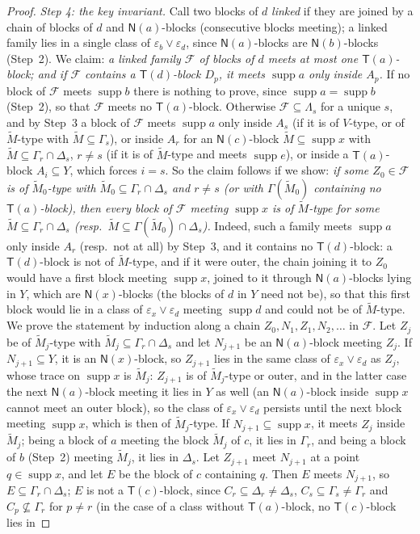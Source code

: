 \documentclass[11pt]{amsart}
\theoremstyle{definition}
\newcommand{\supp}{\operatorname{supp}}
\newcommand{\T}{\mathsf{T}}
\newcommand{\N}{\mathsf{N}}
\begin{document}
\begin{proof}
\smallskip
\emph{Step 4: the key invariant.} Call two blocks of $d$ \emph{linked} if they are joined by a chain of blocks of $d$ and $\N(a)$-blocks (consecutive blocks meeting); a linked family lies in a single class of $\varepsilon_b\vee\varepsilon_d$, since $\N(a)$-blocks are $\N(b)$-blocks (Step~2). We claim: \emph{a linked family $\mathcal F$ of blocks of $d$ meets at most one $\T(a)$-block; and if $\mathcal F$ contains a $\T(d)$-block $D_p$, it meets $\supp a$ only inside $A_p$.} If no block of $\mathcal F$ meets $\supp b$ there is nothing to prove, since $\supp a=\supp b$ (Step~2), so that $\mathcal F$ meets no $\T(a)$-block. Otherwise $\mathcal F\subseteq\Lambda_s$ for a unique $s$, and by Step~3 a block of $\mathcal F$ meets $\supp a$ only inside $A_s$ (if it is of $V$-type, or of $\tilde M$-type with $\tilde M\subseteq\Gamma_s$), or inside $A_r$ for an $\N(c)$-block $\tilde M\subseteq\supp x$ with $\tilde M\subseteq\Gamma_r\cap\Delta_s$, $r\ne s$ (if it is of $\tilde M$-type and meets $\supp e$), or inside a $\T(a)$-block $A_i\subseteq Y$, which forces $i=s$. So the claim follows if we show: \emph{if some $Z_0\in\mathcal F$ is of $\tilde M_0$-type with $\tilde M_0\subseteq\Gamma_r\cap\Delta_s$ and $r\ne s$ (or with $\Gamma(\tilde M_0)$ containing no $\T(a)$-block), then every block of $\mathcal F$ meeting $\supp x$ is of $\tilde M$-type for some $\tilde M\subseteq\Gamma_r\cap\Delta_s$ (resp.\ $\tilde M\subseteq\Gamma(\tilde M_0)\cap\Delta_s$).} Indeed, such a family meets $\supp a$ only inside $A_r$ (resp.\ not at all) by Step~3, and it contains no $\T(d)$-block: a $\T(d)$-block is not of $\tilde M$-type, and if it were outer, the chain joining it to $Z_0$ would have a first block meeting $\supp x$, joined to it through $\N(a)$-blocks lying in $Y$, which are $\N(x)$-blocks (the blocks of $d$ in $Y$ need not be), so that this first block would lie in a class of $\varepsilon_x\vee\varepsilon_d$ meeting $\supp d$ and could not be of $\tilde M$-type. We prove the statement by induction along a chain $Z_0,N_1,Z_1,N_2,\dots$ in $\mathcal F$. Let $Z_j$ be of $\tilde M_j$-type with $\tilde M_j\subseteq\Gamma_r\cap\Delta_s$ and let $N_{j+1}$ be an $\N(a)$-block meeting $Z_j$. If $N_{j+1}\subseteq Y$, it is an $\N(x)$-block, so $Z_{j+1}$ lies in the same class of $\varepsilon_x\vee\varepsilon_d$ as $Z_j$, whose trace on $\supp x$ is $\tilde M_j$: $Z_{j+1}$ is of $\tilde M_j$-type or outer, and in the latter case the next $\N(a)$-block meeting it lies in $Y$ as well (an $\N(a)$-block inside $\supp x$ cannot meet an outer block), so the class of $\varepsilon_x\vee\varepsilon_d$ persists until the next block meeting $\supp x$, which is then of $\tilde M_j$-type. If $N_{j+1}\subseteq\supp x$, it meets $Z_j$ inside $\tilde M_j$; being a block of $a$ meeting the block $\tilde M_j$ of $c$, it lies in $\Gamma_r$, and being a block of $b$ (Step~2) meeting $\tilde M_j$, it lies in $\Delta_s$. Let $Z_{j+1}$ meet $N_{j+1}$ at a point $q\in\supp x$, and let $E$ be the block of $c$ containing $q$. Then $E$ meets $N_{j+1}$, so $E\subseteq\Gamma_r\cap\Delta_s$; $E$ is not a $\T(c)$-block, since $C_r\subseteq\Delta_r\ne\Delta_s$, $C_s\subseteq\Gamma_s\ne\Gamma_r$ and $C_p\not\subseteq\Gamma_r$ for $p\ne r$ (in the case of a class without $\T(a)$-block, no $\T(c)$-block lies in 
\end{proof}
\end{document}
